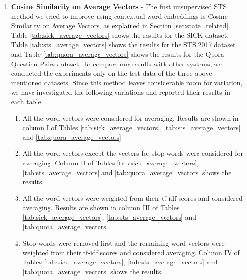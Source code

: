 \begin{enumerate}
	\item \textbf{Cosine Similarity on Average Vectors} - The first unsupervised STS method we tried to improve using contextual word embeddings is Cosine Similarity on Average Vectors, as explained in Section \ref{sec:state_related}. Table \ref{tab:sick_average_vectors} shows the results for the SICK dataset, Table \ref{tab:sts_average_vectors} shows the results for the STS 2017 dataset and Table \ref{tab:quora_average_vectors} shows the results for the Quora Question Pairs dataset. To compare our results with other systems, we conducted the experiments only on the test data of the three above mentioned datasets. Since this method leaves considerable room for variation, we have investigated the following variations and reported their results in each table. 
	
	\begin{enumerate}
		\item All the word vectors were considered for averaging. Results are shown in column I of Tables \ref{tab:sick_average_vectors}, \ref{tab:sts_average_vectors} and \ref{tab:quora_average_vectors}
		
		\item All the word vectors except the vectors for stop words were considered for averaging. Column II of Tables \ref{tab:sick_average_vectors}, \ref{tab:sts_average_vectors} and \ref{tab:quora_average_vectors} shows the results. 
		
		\item All the word vectors were weighted from their tf-idf scores and considered averaging. Results are shown in column III of Tables \ref{tab:sick_average_vectors}, \ref{tab:sts_average_vectors} and \ref{tab:quora_average_vectors}
		
		\item Stop words were removed first and the remaining word vectors were weighted from their tf-idf scores and considered averaging. Column IV of Tables \ref{tab:sick_average_vectors}, \ref{tab:sts_average_vectors} and \ref{tab:quora_average_vectors} shows the results.  
		
	\end{enumerate}
	
\begin{table}[htb]
	\centering
\end{table}
\end{enumerate}
